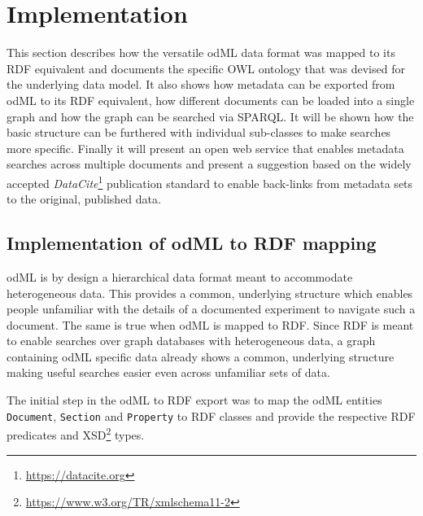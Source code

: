 \documentclass{article}
\begin{document}
\section{Implementation} \label{sec:implementation}

This section describes how the versatile odML data format was mapped to its RDF equivalent and documents the specific OWL ontology that was devised for the underlying data model. It also shows how metadata can be exported from odML to its RDF equivalent, how different documents can be loaded into a single graph and how the graph can be searched via SPARQL. It will be shown how the basic structure can be furthered with individual sub-classes to make searches more specific. Finally it will present an open web service that enables metadata searches across multiple documents and present a suggestion based on the widely accepted \textit{DataCite}\footnote{\url{https://datacite.org}} publication standard to enable back-links from metadata sets to the original, published data.

\subsection{Implementation of odML to RDF mapping} \label{sec:odml_rdf}


odML is by design a hierarchical data format meant to accommodate heterogeneous data. This provides a common, underlying structure which enables people unfamiliar with the details of a documented experiment to navigate such a document. The same is true when odML is mapped to RDF. Since RDF is meant to enable searches over graph databases with heterogeneous data, a graph containing odML specific data already shows a common, underlying structure making useful searches easier even across unfamiliar sets of data.

The initial step in the odML to RDF export was to map the odML entities \texttt{Document}, \texttt{Section} and \texttt{Property} to RDF classes and provide the respective RDF predicates and XSD\footnote{\url{https://www.w3.org/TR/xmlschema11-2}} types.
\end{document}
